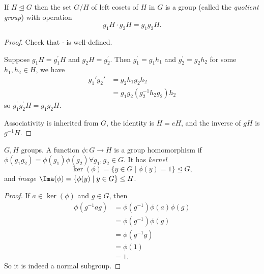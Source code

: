 \begin{proposition}
    If \(H \trianglelefteq G\) then the set \(G / H\) of left cosets of \(H\) in \(G\) is a group (called the \textit{quotient group}) with operation
\[
    g_1 H \cdot g_2 H = g_1 g_2 H.
\]
\end{proposition}
\begin{proof}
Check that \(\cdot\) is well-defined.

Suppose \(g_1 H = g_1 ^\prime H\) and \(g_2 H = g_2 ^\prime\). Then \(g_1 ^\prime =g_1 h_1\) and \(g_2 ^\prime  = g_2 h_2\) for some \(h_1, h_2 \in H\), we have
\begin{align*}
    g_1' g_2' &= g_2h_1g_2h_2\\
    &=g_1 g_2 (g_2^{-1}h_2 g_2)h_2
\end{align*}
so \(g_1 ^\prime g_2 ^\prime  H = g_1 g_2 H\).

Associativity is inherited from \(G\), the identity is \(H = e H\), and the inverse of \(g H\) is \(g^{-1} H\).
\end{proof}

\begin{definition}[Homomorphism]
    \(G, H\) groups. A function \(\phi: G \to H\) is a group homomorphism if \(\phi(g_1 g_2) = \phi(g_1)\phi(g_2) \forall g_1, g_2 \in G\). It has \textit{kernel}
\[
    \ker(\phi) = \{y \in G \mid \phi(y) = 1\} \trianglelefteq G,
\]
and \textit{image} \(\Ima(\phi)= \{\phi(y)\mid y\in G\} \leq H\).
\end{definition}

\begin{proof}
If \(a \in \ker(\phi)\) and \(g \in G\), then
\begin{align*}
    \phi(g^{-1}ag) &= \phi(g^{-1})\phi(a)\phi(g)\\
    &= \phi(g^{-1}) \phi(g)\\
    &= \phi(g^{-1}g)\\
    &= \phi(1)\\
    &= 1.
\end{align*}
So it is indeed a normal subgroup.
\end{proof}